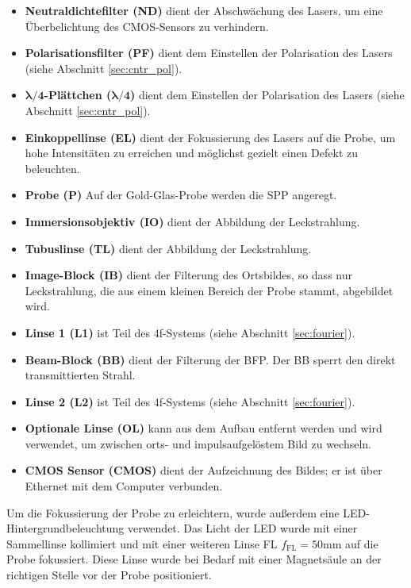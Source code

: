 \documentclass[a4paper, titlepage,  ngerman, fullpage]{book}
\begin{document}
		\begin{itemize}
			\item \textbf{Neutraldichtefilter (ND)} dient der Abschwächung des Lasers, um eine Überbelichtung des CMOS-Sensors zu verhindern.
			\item \textbf{Polarisationsfilter (PF)} dient dem Einstellen der Polarisation des Lasers (siehe Abschnitt \ref{sec:cntr_pol}).
			\item $\boldsymbol{\lambda / 4}$\textbf{-Plättchen (}$\boldsymbol{\lambda / 4}$\textbf{)} dient dem Einstellen der Polarisation des Lasers (siehe Abschnitt \ref{sec:cntr_pol}).
			\item \textbf{Einkoppellinse (EL)} dient der Fokussierung des Lasers auf die Probe, um hohe Intensitäten zu erreichen und möglichst gezielt einen Defekt zu beleuchten.
			\item \textbf{Probe (P)} Auf der Gold-Glas-Probe werden die SPP angeregt.
			\item \textbf{Immersionsobjektiv (IO)} dient der Abbildung der Leckstrahlung.
			\item \textbf{Tubuslinse (TL)} dient der Abbildung der Leckstrahlung.
			\item \textbf{Image-Block (IB)} dient der Filterung des Ortsbildes, so dass nur Leckstrahlung, die aus einem kleinen Bereich der Probe stammt, abgebildet wird.			
			\item \textbf{Linse 1 (L1)} ist Teil des 4f-Systems (siehe Abschnitt \ref{sec:fourier}).
			\item \textbf{Beam-Block (BB)} dient der Filterung der BFP. Der BB sperrt den direkt transmittierten Strahl.			
			\item \textbf{Linse 2 (L2)} ist Teil des 4f-Systems (siehe Abschnitt \ref{sec:fourier}).
			\item \textbf{Optionale Linse (OL)} kann aus dem Aufbau entfernt werden und wird verwendet, um zwischen orts- und impulsaufgelöstem Bild zu wechseln.
			\item \textbf{CMOS Sensor (CMOS)}  dient der Aufzeichnung des Bildes; er ist über Ethernet mit dem Computer verbunden.			
		\end{itemize}
		Um die Fokussierung der Probe zu erleichtern, wurde außerdem eine LED-Hintergrundbeleuchtung verwendet. Das Licht der LED wurde mit einer Sammellinse kollimiert und mit einer weiteren Linse FL $f_{\mathrm{FL}}=50\mathrm{mm}$ auf die  Probe fokussiert. Diese Linse wurde bei Bedarf mit einer Magnetsäule an der richtigen Stelle vor der Probe positioniert.
		
\end{document}
